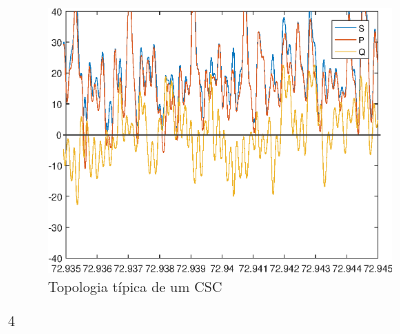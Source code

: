 \begin{figure}[!htb]
\begin{subfigure}[b]{0.48\textwidth}
		\includegraphics[width=\textwidth]{Cap4/Figuras/resultados_filt_4.eps}
		\caption{Topologia típica de um CSC}    
		\label{fig:resultados_filt_4.eps}
	\end{subfigure}%
	\caption{4}
	\label{fig:4}
\end{figure}

